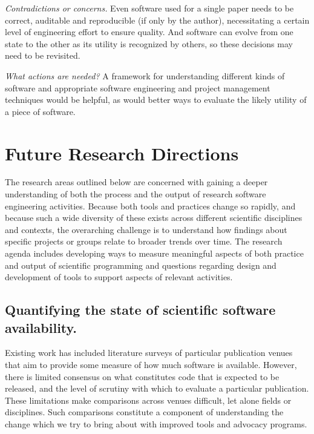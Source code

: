 \documentclass[a4paper,UKenglish]{dagman}
\begin{document}
\emph{Contradictions or concerns.} Even software used for a single paper needs to be correct, auditable and reproducible (if only by the author), necessitating a certain level of engineering effort to ensure quality. And software can evolve from one state to the other as its utility is recognized by others, so these decisions may need to be revisited. 

\emph{What actions are needed?}
A framework for understanding different kinds of software and appropriate software engineering and project management techniques would be helpful, as would better ways to evaluate the likely utility of a piece of software. 



\section{Future Research Directions}

The research areas outlined below are concerned with gaining a deeper understanding of both the process and the output of research software engineering activities. Because both tools and practices change so rapidly, and because such a wide diversity of these exists across different scientific disciplines and contexts, the overarching challenge is to understand how findings about specific projects or groups relate to broader trends over time. The research agenda includes developing ways to measure meaningful aspects of both practice and output of scientific programming and questions regarding design and development of tools to support aspects of relevant activities.


\subsection{Quantifying the state of scientific software availability.}

Existing work has included literature surveys of particular publication venues  that aim to provide some measure of how much software is available. However, there is limited consensus on what constitutes code that is expected to be released, and the level of scrutiny with which to evaluate a particular publication. These limitations make comparisons across venues difficult, let alone fields or disciplines. Such comparisons constitute a component of understanding the change which we try to bring about with improved tools and advocacy programs. 
\end{document}
